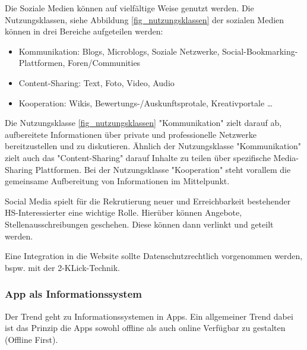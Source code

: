 Die Soziale Medien können auf vielfältige Weise genutzt werden. Die Nutzungsklassen, siehe Abbildung \ref{fig_nutzungsklassen} der sozialen Medien können in drei Bereiche aufgeteilen werden:


\begin{itemize}
  \item Kommunikation: Blogs, Microblogs, Soziale Netzwerke, Social-Bookmarking-Plattformen, Foren/Communities
  \item Content-Sharing: Text, Foto, Video, Audio
  \item Kooperation: Wikis, Bewertungs-/Auskunftsprotale, Kreativportale \ldots
\end{itemize}

Die Nutzungsklasse \ref{fig_nutzungsklassen} "Kommunikation" zielt darauf ab, aufbereitete Informationen über private und professionelle Netzwerke bereitzustellen und zu diskutieren.
Ähnlich der Nutzungsklasse "Kommunikation" zielt auch das "Content-Sharing" darauf Inhalte zu teilen über spezifische Media-Sharing Plattformen.
Bei der Nutzungsklasse "Kooperation" steht vorallem die gemeinsame Aufbereitung von Informationen im Mittelpunkt.

Social Media spielt für die Rekrutierung neuer und Erreichbarkeit bestehender HS-Interessierter eine wichtige Rolle. Hierüber können Angebote, Stellenausschreibungen geschehen. Diese können dann verlinkt und geteilt werden. 

Eine Integration in die Website sollte Datenschutzrechtlich vorgenommen werden, bspw. mit der 2-KLick-Technik.


\subsubsection{App als Informationssystem}
Der Trend geht zu Informationssystemen in Apps. Ein allgemeiner Trend dabei ist das Prinzip die Apps sowohl offline als auch online Verfügbar zu gestalten (Offline First).

